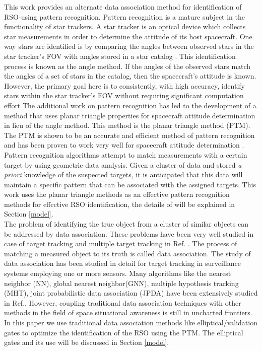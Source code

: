 \documentclass[]{aiaa-tc}%
\begin{document}
This work provides an alternate data association method for identification of RSO-using pattern recognition. Pattern recognition is a mature subject in the
functionality of star trackers. A star tracker is an optical device which collects star measurements in order to determine the attitude of its host spacecraft. One way stars are identified is by comparing
the angles between observed stars in the star tracker's FOV with angles stored in a star catalog \cite{Silversmith}.
This identification process is known as the angle method. If the angles of the observed stars match
the angles of a set of stars in the catalog, then the spacecraft's attitude is known. However, the
primary goal here is to consistently, with high accuracy, identify stars within the star tracker's FOV
without requiring significant computation effort
The additional work on pattern recognition has led to the development of a method that uses planar triangle properties for spacecraft attitude determination in lieu of the angle method.  This method is the planar triangle method (PTM). The PTM is shown to be an accurate and efficient method of pattern recognition and has been proven to work very well for spacecraft attitude determination \cite{cole_fast_2006}. Pattern recognition algorithms attempt to match measurements with a certain target by using geometric data analysis. Given a cluster of data and stored \textit{a priori} knowledge of the suspected targets, it is anticipated that this data will maintain a specific pattern that can be associated with the assigned targets. This work uses the planar triangle methods as an effective pattern recognition methods for effective RSO identification, the details of will be explained in Section \ref{model}.\\ 

The problem of identifying the true object from a cluster of similar objects can be addressed by data association. These problems have been very well studied in case of target tracking and multiple target tracking in  Ref. . The process of matching a measured object to its truth is called data association. The study of data association has been studied in detail for target tracking in surveillance systems employing one or more sensors. Many algorithms like the nearest neighbor (NN), global nearest neighbor(GNN), multiple hypothesis tracking (MHT), joint probabilistic data association (JPDA) have been extensively studied in Ref.. However, coupling traditional data association techniques with other methods in the field of space situational awareness is still in uncharted frontiers. In this paper we use traditional data association methods like elliptical/validation gates to optimize the identification of the RSO using the PTM. The elliptical gates and its use will be discussed in Section \ref{model}. 
\end{document}
